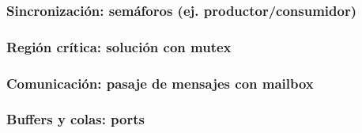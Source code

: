 \documentclass[8pt,aspectratio=169,compress]{beamer}
\begin{document}
\subsubsection{Sincronización: semáforos (ej. productor/consumidor)}
\subsubsection{Región crítica: solución con mutex}
\subsubsection{Comunicación: pasaje de mensajes con mailbox}
\subsubsection{Buffers y colas: ports}
\end{document}
